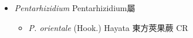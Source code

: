 
  \begin{itemize}
 \item[] \textit{Pentarhizidium} Pentarhizidium屬
                                
  \begin{itemize}
        \item[] \textit{P. orientale} (Hook.) Hayata  東方莢果蕨   CR
  \end{itemize}
  \end{itemize}
